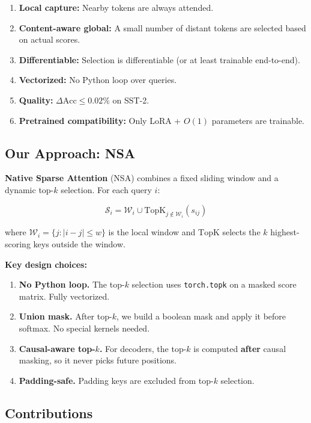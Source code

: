 \begin{enumerate}
\item \textbf{Local capture:} Nearby tokens are always attended.
\item \textbf{Content-aware global:} A small number of distant tokens are selected
  based on actual scores.
\item \textbf{Differentiable:} Selection is differentiable (or at least
  trainable end-to-end).
\item \textbf{Vectorized:} No Python loop over queries.
\item \textbf{Quality:} $\Delta\text{Acc} \leq 0.02\%$ on SST-2.
\item \textbf{Pretrained compatibility:} Only LoRA + $O(1)$ parameters are trainable.

\end{enumerate}
\subsection{Our Approach: NSA}

\textbf{Native Sparse Attention} (NSA) combines a fixed sliding window and a 
dynamic top-$k$ selection. For each query $i$:

\[
\mathcal{S}_i = \mathcal{W}_i \cup \text{TopK}_{j \notin \mathcal{W}_i}(s_{ij})
\tag{1.1}
\]

where $\mathcal{W}_i = \{j : |i - j| \leq w\}$ is the local window and 
$\text{TopK}$ selects the $k$ highest-scoring keys outside the window.

\textbf{Key design choices:}

\begin{enumerate}
\item \textbf{No Python loop.} The top-$k$ selection uses \texttt{torch.topk} on a
  masked score matrix. Fully vectorized.
\item \textbf{Union mask.} After top-$k$, we build a boolean mask and apply it
  before softmax. No special kernels needed.
\item \textbf{Causal-aware top-$k$.} For decoders, the top-$k$ is computed
  \textbf{after} causal masking, so it never picks future positions.
\item \textbf{Padding-safe.} Padding keys are excluded from top-$k$ selection.

\end{enumerate}
\subsection{Contributions}

